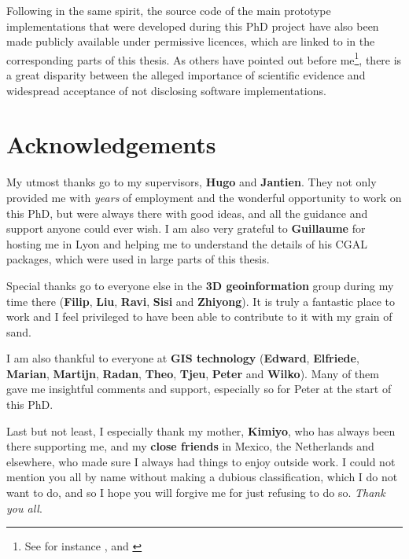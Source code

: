 Following in the same spirit, the source code of the main prototype implementations that were developed during this PhD project have also been made publicly available under permissive licences, which are linked to in the corresponding parts of this thesis.
As others have pointed out before me\footnote{See for instance \citet{Morin12}, \citet{Joppa13} and \citet{Ince12}}, there is a great disparity between the alleged importance of scientific evidence and widespread acceptance of not disclosing software implementations.

\section*{Acknowledgements}

My utmost thanks go to my supervisors, \textbf{Hugo} and \textbf{Jantien}.
They not only provided me with \emph{years} of employment and the wonderful opportunity to work on this PhD, but were always there with good ideas, and all the guidance and support anyone could ever wish.
I am also very grateful to \textbf{Guillaume} for hosting me in Lyon and helping me to understand the details of his CGAL packages, which were used in large parts of this thesis.

Special thanks go to everyone else in the \textbf{3D geoinformation} group during my time there (\textbf{Filip}, \textbf{Liu}, \textbf{Ravi}, \textbf{Sisi} and \textbf{Zhiyong}).
It is truly a fantastic place to work and I feel privileged to have been able to contribute to it with my grain of sand.

I am also thankful to everyone at \textbf{GIS technology} (\textbf{Edward}, \textbf{Elfriede}, \textbf{Marian}, \textbf{Martijn}, \textbf{Radan}, \textbf{Theo}, \textbf{Tjeu}, \textbf{Peter} and \textbf{Wilko}).
Many of them gave me insightful comments and support, especially so for Peter at the start of this PhD.

Last but not least, I especially thank my mother, \textbf{Kimiyo}, who has always been there supporting me, and my \textbf{close friends} in Mexico, the Netherlands and elsewhere, who made sure I always had things to enjoy outside work.
I could not mention you all by name without making a dubious classification, which I do not want to do, and so I hope you will forgive me for just refusing to do so.
\emph{Thank you all}.